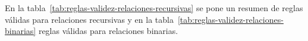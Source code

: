 En la tabla~\ref{tab:reglas-validez-relaciones-recursivas} se pone un resumen de reglas válidas para relaciones recursivas y en la tabla~\ref{tab:reglas-validez-relaciones-binarias} reglas válidas para relaciones binarias.

